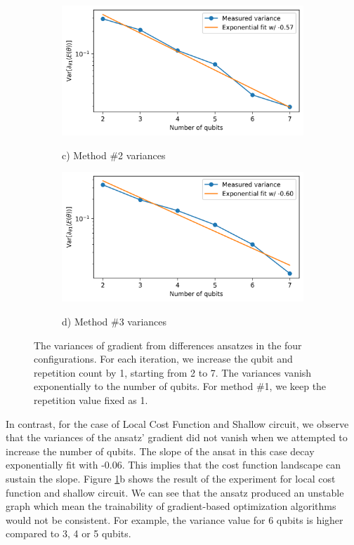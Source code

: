 \begin{figure}
    \begin{subfigure}[b]{.49\textwidth}
        \includegraphics[width=\textwidth]{Artefact/Appendices/var2.png}
        \centerline{c) Method \#2 variances}
    \end{subfigure}
    \hfill
    \begin{subfigure}[b]{.49\textwidth}
        \includegraphics[width=\textwidth]{Artefact/Appendices/var3.png}
        \centerline{d) Method \#3 variances}
    \end{subfigure}

    \caption{
        The variances of gradient from differences ansatzes in the four configurations.
        For each iteration, we increase the qubit and repetition count by 1, starting from 2 to 7.
        The variances vanish exponentially to the number of qubits.
        For method \#1, we keep the repetition value fixed as 1.
    }
    \label{Plot ansatzes variance}
\end{figure}

In contrast, for the case of Local Cost Function and Shallow circuit, we observe that the variances of the ansatz' gradient did not vanish when we attempted to increase the number of qubits.
The slope of the ansat in this case decay exponentially fit with -0.06.
This implies that the cost function landscape can sustain the slope.
Figure \ref{Plot ansatzes variance}b shows the result of the experiment for local cost function and shallow circuit.
We can see that the ansatz produced an unstable graph which mean the trainability of gradient-based optimization algorithms would not be consistent.
For example, the variance value for 6 qubits is higher compared to 3, 4 or 5 qubits.

